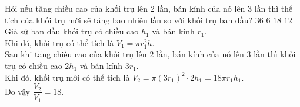 \begin{ex} %
	Hỏi nếu tăng chiều cao của khối trụ lên 2 lần, bán kính của nó lên 3 lần thì thể tích của khối trụ mới sẽ tăng bao nhiêu lần so với khối trụ ban đầu?
	\choice
	{$36$}
	{$6$}
	{\True$18$}
	{$12$}
	\loigiai
	{Giả sử ban đầu khối trụ có chiều cao $h_1$ và bán kính $r_1$.\\
		Khi đó, khối trụ có thể tích là $V_1=\pi r_1^2h$.\\
		Sau khi tăng chiều cao của khối trụ lên $ 2$ lần, bán kính của nó lên $3$ lần thì khối trụ có chiều cao $ 2h_1$ và bán kính $3r_1$.\\
		Khi đó, khối trụ mới có thể tích là $V_2=\pi{\left(3r_1\right)^2}\cdot2h_1=18\pi{r_1}{h_1}$.\\
		Do vậy $\dfrac{V_2}{V_1}=18$.}
\end{ex}
